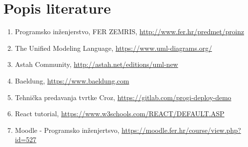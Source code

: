 \chapter*{Popis literature}



\begin{enumerate}
	
	
	\item  Programsko inženjerstvo, FER ZEMRIS, \url{http://www.fer.hr/predmet/proinz}
	
	\item  The Unified Modeling Language, \url{https://www.uml-diagrams.org/}
	
	\item  Astah  Community, \url{http://astah.net/editions/uml-new}
	
	\item  Baeldung, \url{https://www.baeldung.com}
	
	\item  Tehnička predavanja tvrtke Croz, \url{https://gitlab.com/progi-deploy-demo}
	
	\item  React tutorial, \url{ https://www.w3schools.com/REACT/DEFAULT.ASP}
	
	\item Moodle - Programsko inženjertsvo, \url{https://moodle.fer.hr/course/view.php?id=527}
\end{enumerate}

